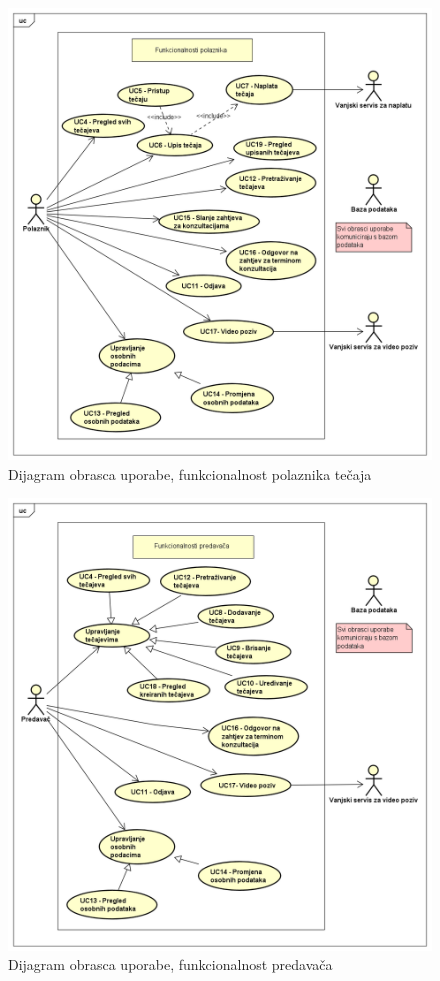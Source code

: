 					\begin{figure}[h]
						\includegraphics[scale=0.55]{dijagrami/UML_pol.PNG}
						\centering
						\caption{Dijagram obrasca uporabe, funkcionalnost polaznika tečaja}
						\label{fig:UML_pol}
					\end{figure}
				\eject
				
					\begin{figure}[h]
						\includegraphics[scale=0.55]{dijagrami/UML_pred.PNG}
						\centering
						\caption{Dijagram obrasca uporabe, funkcionalnost predavača}
						\label{fig:UML_pred}
					\end{figure}
				\eject			
				
